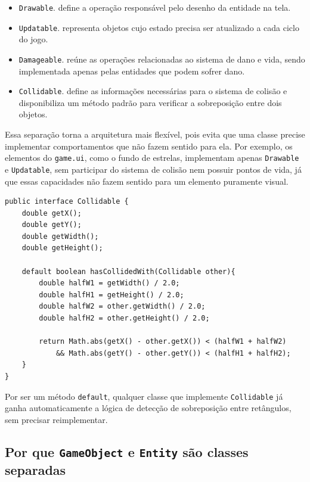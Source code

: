 \begin{itemize}
    \item \texttt{Drawable}. define a operação responsável pelo desenho da entidade na tela.
    \item \texttt{Updatable}. representa objetos cujo estado precisa ser atualizado a cada ciclo do jogo.
    \item \texttt{Damageable}. reúne as operações relacionadas ao sistema de dano e vida, sendo implementada apenas pelas entidades que podem sofrer dano.
    \item \texttt{Collidable}. define as informações necessárias para o sistema de colisão e disponibiliza um método padrão para verificar a sobreposição entre dois objetos.
\end{itemize}

Essa separação torna a arquitetura mais flexível, pois evita que uma classe
precise implementar comportamentos que não fazem sentido para ela. Por exemplo,
os elementos do \texttt{game.ui}, como o fundo de estrelas, implementam apenas
\texttt{Drawable} e \texttt{Updatable}, sem participar do sistema de colisão
nem possuir pontos de vida, já que essas capacidades não fazem sentido para um
elemento puramente visual.

\begin{lstlisting}[caption={contrato e comprtamento padrão da interface \texttt{Collidable} (Collidable.java)}]
public interface Collidable {
    double getX();
    double getY();
    double getWidth();
    double getHeight();

    default boolean hasCollidedWith(Collidable other){
        double halfW1 = getWidth() / 2.0;
        double halfH1 = getHeight() / 2.0;
        double halfW2 = other.getWidth() / 2.0;
        double halfH2 = other.getHeight() / 2.0;

        return Math.abs(getX() - other.getX()) < (halfW1 + halfW2)
            && Math.abs(getY() - other.getY()) < (halfH1 + halfH2);
    }
}
\end{lstlisting}

Por ser um método \texttt{default}, qualquer classe que implemente
\texttt{Collidable} já ganha automaticamente a lógica de detecção de
sobreposição entre retângulos, sem precisar reimplementar.

\subsection{Por que \texttt{GameObject} e \texttt{Entity} são classes separadas}

